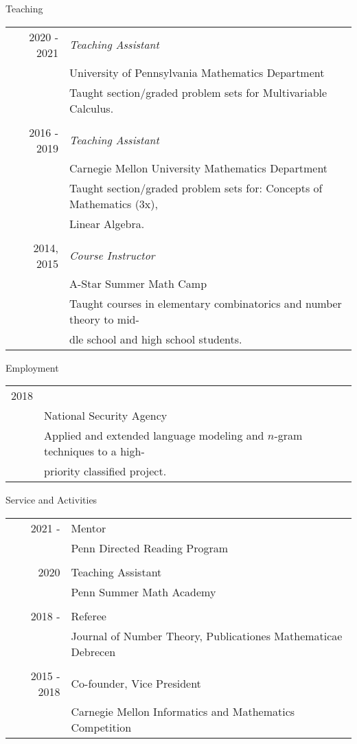 \documentclass{article}
\begin{document}
\newpage
\Large{Teaching}\vspace{0.2in}\\
\normalsize
\begin{tabular}{r l}
	2020 - 2021 & \textit{Teaching Assistant}\\
	& University of Pennsylvania Mathematics Department\\
	&\small{Taught section/graded problem sets for Multivariable Calculus}.\\
	&\\
	2016 - 2019 & \textit{Teaching Assistant}\\
	& Carnegie Mellon University Mathematics Department\\
	& \small{Taught section/graded problem sets for: Concepts of Mathematics (3x),}\\
	& \small{Linear Algebra.} \normalsize\\
	&\\
	2014, 2015 & \textit{Course Instructor}\\
	& A-Star Summer Math Camp\\
	& \small{Taught courses in elementary combinatorics and number theory to mid-}\\
	& \small{dle school and high school students}.
\end{tabular}

\vspace{0.25in}
\Large{Employment}\vspace{0.2in}\\
\normalsize
\begin{tabular}{r l}
	2018 & \text{Research Intern}\\
	& National Security Agency\\
	&\small{Applied and extended language modeling and $n$-gram techniques to a high-}\\
	&\small{priority classified project.}
\end{tabular}

\vspace{0.25in}
\Large{Service and Activities}\vspace{0.2in}\\
\normalsize
\begin{tabular}{r l}
	2021 - & Mentor\\
	& Penn Directed Reading Program\\
	&\\
	2020 & Teaching Assistant\\
	& Penn Summer Math Academy\\
	&\\
	2018 - & Referee\\
	& Journal of Number Theory, Publicationes Mathematicae Debrecen\\
	&\\
	2015 - 2018 & Co-founder, Vice President\\
	& Carnegie Mellon Informatics and Mathematics Competition
\end{tabular}
\end{document}
